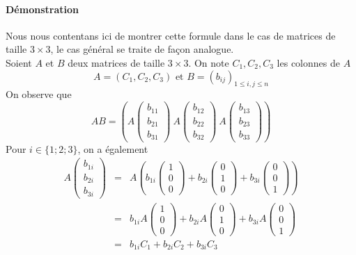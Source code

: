 \paragraph{Démonstration} Nous nous contentans ici de montrer cette formule dans le cas de matrices de taille $3 \times 3$, le cas général se traite de façon analogue. \\
Soient $A$ et $B$ deux matrices de taille $3 \times 3$. On note $C_1, C_2, C_3$ les colonnes de $A$
$$A = (C_1, C_2, C_3) \text{ et } B=(b_{ij})_{1 \leq i, j \leq n}$$
On observe que
$$A B = \left(
  A \begin{pmatrix} b_{11} \\ b_{21} \\ b_{31} \end{pmatrix} ~ 
  A \begin{pmatrix} b_{12} \\ b_{22} \\ b_{32} \end{pmatrix} ~ 
  A \begin{pmatrix} b_{13} \\ b_{23} \\ b_{33} \end{pmatrix}
\right)$$
Pour $i \in \{1; 2; 3\}$, on a également
\begin{eqnarray*}
  A \begin{pmatrix} b_{1i} \\ b_{2i} \\ b_{3i} \end{pmatrix}
  &=& A \left( b_{1i} \begin{pmatrix} 1 \\ 0 \\ 0 \end{pmatrix} + b_{2i} \begin{pmatrix} 0 \\ 1 \\ 0 \end{pmatrix} + b_{3i} \begin{pmatrix} 0 \\ 0 \\ 1 \end{pmatrix} \right) \\
    &=& b_{1i} A \begin{pmatrix} 1 \\ 0 \\ 0 \end{pmatrix} + b_{2i} A \begin{pmatrix} 0 \\ 1 \\ 0 \end{pmatrix} + b_{3i} A \begin{pmatrix} 0 \\ 0 \\ 1 \end{pmatrix} \\
    &=& b_{1i} C_1 + b_{2i} C_2 + b_{3i} C_3
\end{eqnarray*}

